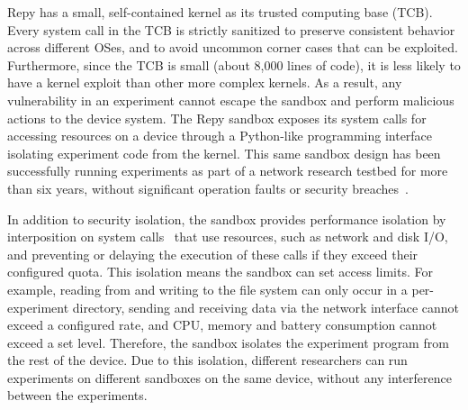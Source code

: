 Repy has a small, self-contained kernel as its trusted 
computing base (TCB). %
Every system call in the TCB is strictly 
sanitized to preserve consistent behavior across different OSes, 
and to avoid uncommon corner cases that can be exploited. 
Furthermore, since the TCB is small (about 8,000 lines of code), it is 
less likely to have a kernel exploit than other more complex kernels. 
As a result, any vulnerability in an experiment 
cannot escape the sandbox and perform malicious actions to 
the device system. The Repy sandbox exposes its system calls for 
accessing resources on a device through a Python-like programming 
interface~\cite{repyv2} isolating experiment code from the kernel. 
This same sandbox design has been successfully running experiments as part of a network research 
testbed for more than six years, without significant operation faults or security breaches~\cite{seattle}.  

In addition to security isolation,
the sandbox provides performance isolation by
interposition on system calls~\cite{garfinkel2003traps} that 
use resources, such as network and disk I/O, and preventing 
or delaying the execution of these calls if they exceed 
their configured quota. 
This isolation means the sandbox can set access limits. For example, 
reading from and writing to the file system can
only occur in a per-experiment directory, sending and receiving
data via the network interface cannot exceed a configured rate, and 
CPU, memory and battery consumption cannot exceed a set level.
Therefore, the sandbox isolates the experiment program from 
the rest of the device. Due to this isolation, different researchers 
can run experiments on different sandboxes on the same device, 
without any interference between the experiments.


